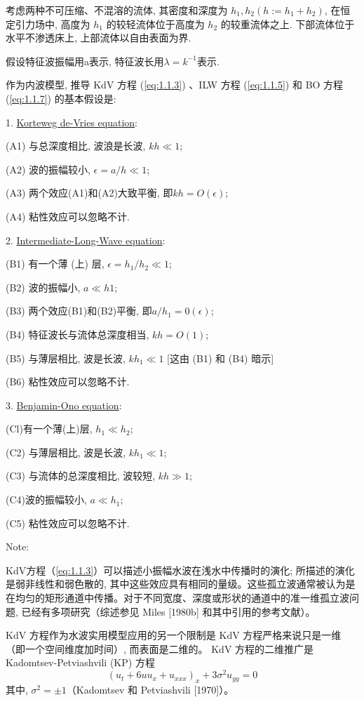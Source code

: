 \documentclass[14pt,a4paper,oneside]{article}
\numberwithin{equation}{subsection}             %
\begin{document}
考虑两种不可压缩、不混溶的流体, 其密度和深度为 $h_1, h_2 (h := h_1 + h_2)$, 在恒定引力场中, 高度为 $h_1$ 的较轻流体位于高度为 $h_2$ 的较重流体之上. 下部流体位于水平不渗透床上, 上部流体以自由表面为界. 

假设特征波振幅用a表示, 特征波长用$\lambda =k^{-1}$表示. 

作为内波模型, 推导 KdV 方程 (\ref{eq:1.1.3}) 、ILW 方程 (\ref{eq:1.1.5}) 和 BO 方程 (\ref{eq:1.1.7}) 的基本假设是:

1. \underline{Korteweg de-Vries equation}:

(A1) 与总深度相比, 波浪是长波, $kh \ll 1$; 

(A2) 波的振幅较小, $\epsilon  = a/h \ll 1$; 

(A3) 两个效应(A1)和(A2)大致平衡, 即$kh = O(\epsilon )$; 

(A4) 粘性效应可以忽略不计. 

2. \underline{Intermediate-Long-Wave equation}:

(B1) 有一个薄 (上) 层, $\epsilon  = h_1/h_2 \ll 1$; 

(B2) 波的振幅小, $a \ll h1$;

(B3) 两个效应(B1)和(B2)平衡, 即$a/h_1 = 0(\epsilon )$; 

(B4) 特征波长与流体总深度相当, $kh = O(1)$; 

(B5) 与薄层相比, 波是长波, $kh_1 \ll 1$ [这由 (B1) 和 (B4) 暗示]

(B6) 粘性效应可以忽略不计. 

3. \underline{Benjamin-Ono equation}:

(Cl)有一个薄(上)层, $h_1 \ll h_2$;   

(C2) 与薄层相比, 波是长波, $kh_1 \ll 1$;   

(C3) 与流体的总深度相比, 波较短, $kh \gg 1$;  

(C4)波的振幅较小, $a\ll h_1$;

(C5) 粘性效应可以忽略不计. 

Note:

KdV方程（\ref{eq:1.1.3}）可以描述小振幅水波在浅水中传播时的演化; 所描述的演化是弱非线性和弱色散的, 其中这些效应具有相同的量级。这些孤立波通常被认为是在均匀的矩形通道中传播。对于不同宽度、深度或形状的通道中的准一维孤立波问题, 已经有多项研究（综述参见 Miles [1980b] 和其中引用的参考文献）。

KdV 方程作为水波实用模型应用的另一个限制是 KdV 方程严格来说只是一维（即一个空间维度加时间）, 而表面是二维的。 KdV 方程的二维推广是 Kadomtsev-Petviashvili (KP) 方程
\begin{equation}
    (u_t+6uu_x+u_{xxx})_x+3\sigma^2u_{yy}=0
    \label{eq:1.1.10}
\end{equation}
其中, $\sigma^2 = \pm1$（Kadomtsev 和 Petviashvili [1970]）。
\end{document}
